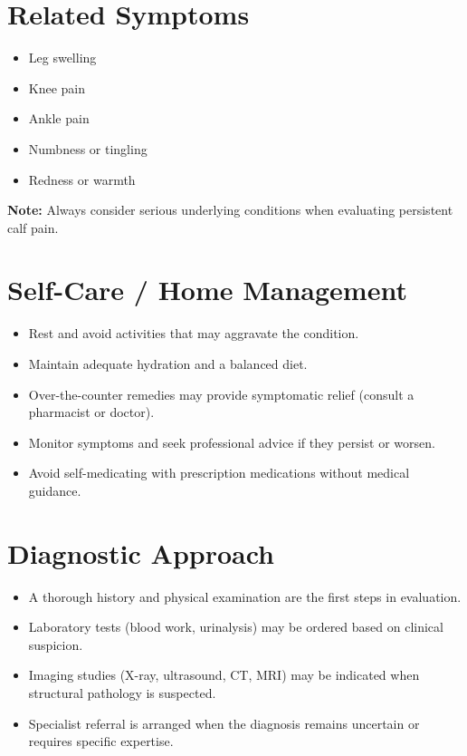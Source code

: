 \section*{Related Symptoms}
\begin{itemize}
  \item Leg swelling
  \item Knee pain
  \item Ankle pain
  \item Numbness or tingling
  \item Redness or warmth
\end{itemize}
\textbf{Note:} Always consider serious underlying conditions when evaluating persistent calf pain.

\section*{Self-Care / Home Management}
\begin{itemize}
  \item Rest and avoid activities that may aggravate the condition.
  \item Maintain adequate hydration and a balanced diet.
  \item Over-the-counter remedies may provide symptomatic relief (consult a pharmacist or doctor).
  \item Monitor symptoms and seek professional advice if they persist or worsen.
  \item Avoid self-medicating with prescription medications without medical guidance.
\end{itemize}

\section*{Diagnostic Approach}
\begin{itemize}
  \item A thorough history and physical examination are the first steps in evaluation.
  \item Laboratory tests (blood work, urinalysis) may be ordered based on clinical suspicion.
  \item Imaging studies (X-ray, ultrasound, CT, MRI) may be indicated when structural pathology is suspected.
  \item Specialist referral is arranged when the diagnosis remains uncertain or requires specific expertise.
\end{itemize}

